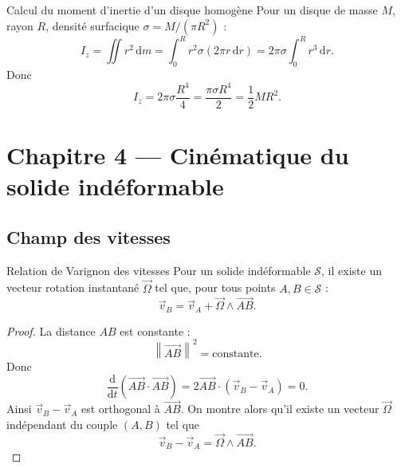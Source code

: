 \documentclass[11pt,a4paper]{article}
\newcommand{\vect}[1]{\overrightarrow{#1}}
\newcommand{\dd}{\,\mathrm{d}}
\newcommand{\der}[2]{\frac{\mathrm{d}#1}{\mathrm{d}#2}}
\newcommand{\norm}[1]{\left\lVert #1 \right\rVert}
\newcommand{\Solide}{\mathcal S}
\begin{document}
\begin{correctionbox}{Calcul du moment d'inertie d'un disque homogène}{}
Pour un disque de masse $M$, rayon $R$, densité surfacique $\sigma=M/(\pi R^2)$ :
\[
I_z=\iint r^2\dd m
=\int_0^R r^2\sigma(2\pi r\dd r)
=2\pi\sigma\int_0^R r^3\dd r.
\]
Donc
\[
I_z=2\pi\sigma\frac{R^4}{4}
=\frac{\pi\sigma R^4}{2}
=\frac12 MR^2.
\]
\end{correctionbox}

\section{Chapitre 4 — Cinématique du solide indéformable}

\subsection{Champ des vitesses}

\begin{theoremBox}{Relation de Varignon des vitesses}{}
Pour un solide indéformable $\Solide$, il existe un vecteur rotation instantané $\vec\Omega$ tel que, pour tous points $A,B\in\Solide$ :
\[
\vec v_B=\vec v_A+\vec\Omega\wedge\vect{AB}.
\]
\end{theoremBox}

\begin{proof}
La distance $AB$ est constante :
\[
\norm{\vect{AB}}^2=\text{constante}.
\]
Donc
\[
\der{}{t}\left(\vect{AB}\cdot\vect{AB}\right)=2\vect{AB}\cdot(\vec v_B-\vec v_A)=0.
\]
Ainsi $\vec v_B-\vec v_A$ est orthogonal à $\vect{AB}$. On montre alors qu'il existe un vecteur $\vec\Omega$ indépendant du couple $(A,B)$ tel que
\[
\vec v_B-\vec v_A=\vec\Omega\wedge\vect{AB}.
\]
\end{proof}

\begin{center}
\end{center}
\end{document}
